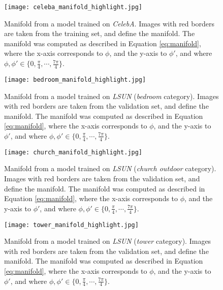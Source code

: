 \documentclass{article}
\begin{document}
\begin{figure}[H]
\vspace{80pt}
    \centering \texttt{[image: celeba\_manifold\_highlight.jpg]}
    \caption{Manifold from a model trained on \emph{CelebA}. Images with red borders are taken from the training set, and define the manifold. The manifold was computed as described in Equation \ref{eq:manifold}, where the x-axis corresponds to $\phi$, and the y-axis to $\phi'$, and where $\phi, \phi' \in \{0, \frac{\pi}{4}, \cdots, \frac{7\pi}{4}\}$. }
\end{figure}

\begin{figure}[H]
\vspace{80pt}
    \centering \texttt{[image: bedroom\_manifold\_highlight.jpg]}
    \caption{Manifold from a model trained on \emph{LSUN} (\emph{bedroom} category). Images with red borders are taken from the validation set, and define the manifold. The manifold was computed as described in Equation \ref{eq:manifold}, where the x-axis corresponds to $\phi$, and the y-axis to $\phi'$, and where $\phi, \phi' \in \{0, \frac{\pi}{4}, \cdots, \frac{7\pi}{4}\}$. }
\end{figure}

\begin{figure}[H]
\vspace{80pt}
    \centering \texttt{[image: church\_manifold\_highlight.jpg]}
    \caption{Manifold from a model trained on \emph{LSUN} (\emph{church outdoor} category). Images with red borders are taken from the validation set, and define the manifold. The manifold was computed as described in Equation \ref{eq:manifold}, where the x-axis corresponds to $\phi$, and the y-axis to $\phi'$, and where $\phi, \phi' \in \{0, \frac{\pi}{4}, \cdots, \frac{7\pi}{4}\}$. }
\end{figure}

\begin{figure}[H]
\vspace{30pt}
    \centering \texttt{[image: tower\_manifold\_highlight.jpg]}
    \caption{Manifold from a model trained on \emph{LSUN} (\emph{tower} category). Images with red borders are taken from the validation set, and define the manifold. The manifold was computed as described in Equation \ref{eq:manifold}, where the x-axis corresponds to $\phi$, and the y-axis to $\phi'$, and where $\phi, \phi' \in \{0, \frac{\pi}{4}, \cdots, \frac{7\pi}{4}\}$. }
\end{figure}
\end{document}
